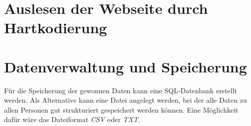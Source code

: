 \section{Auslesen der Webseite durch Hartkodierung}

\section{Datenverwaltung und Speicherung}
Für die Speicherung der gewonnen Daten kann eine SQL-Datenbank erstellt werden.
Als Alternative kann eine Datei angelegt werden, bei der alle Daten zu allen Personen gut strukturiert gespeichert werden können. Eine Möglichkeit dafür wäre das Dateiformat \textit{CSV} oder \textit{TXT}.